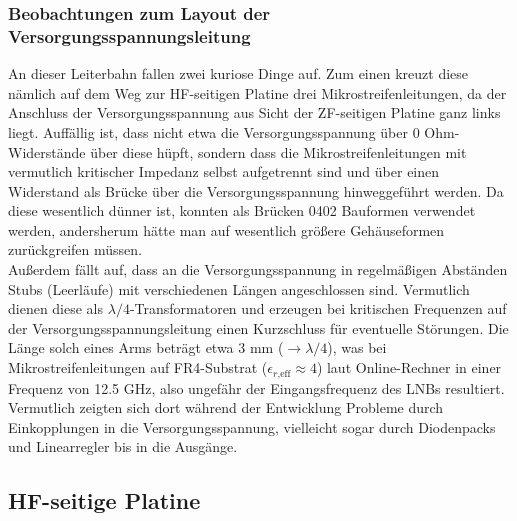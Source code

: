 \documentclass[]{article}
\begin{document}
	\subsubsection{Beobachtungen zum Layout der Versorgungsspannungsleitung}
		
		\noindent An dieser Leiterbahn fallen zwei kuriose Dinge auf. Zum einen kreuzt diese nämlich auf dem Weg zur HF-seitigen Platine drei Mikrostreifenleitungen, da der Anschluss der Versorgungsspannung aus Sicht der ZF-seitigen Platine ganz links liegt. Auffällig ist, dass nicht etwa die Versorgungsspannung über 0 Ohm-Widerstände über diese hüpft, sondern dass die Mikrostreifenleitungen mit vermutlich kritischer Impedanz selbst aufgetrennt sind und über einen Widerstand als Brücke über die Versorgungsspannung hinweggeführt werden. Da diese wesentlich dünner ist, konnten als Brücken 0402 Bauformen verwendet werden, andersherum hätte man auf wesentlich größere Gehäuseformen zurückgreifen müssen.\\
		
		\noindent Außerdem fällt auf, dass an die Versorgungsspannung in regelmäßigen Abständen Stubs (Leerläufe) mit verschiedenen Längen angeschlossen sind. Vermutlich dienen diese als $\lambda/4$-Transformatoren und erzeugen bei kritischen Frequenzen auf der Versorgungsspannungsleitung einen Kurzschluss für eventuelle Störungen. Die Länge solch eines Arms beträgt etwa 3 mm ($\rightarrow\lambda/4$), was bei Mikrostreifenleitungen auf FR4-Substrat ($\epsilon_{r\text{,eff}}\approx4$) laut Online-Rechner in einer Frequenz von 12.5 GHz, also ungefähr der Eingangsfrequenz des LNBs resultiert. Vermutlich zeigten sich dort während der Entwicklung Probleme durch Einkopplungen in die Versorgungsspannung, vielleicht sogar durch Diodenpacks und Linearregler bis in die Ausgänge.
		
	\subsection{HF-seitige Platine}
	
\end{document}
